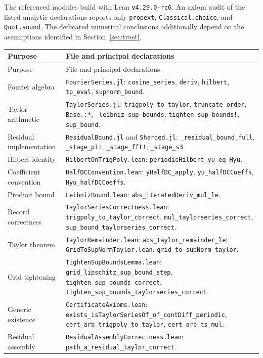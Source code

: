 \documentclass[11pt]{article}
\theoremstyle{definition}
\theoremstyle{remark}
\newcommand{\code}[1]{\nolinkurl{#1}}
\numberwithin{equation}{section}
\begin{document}
The referenced modules build with Lean \code{v4.29.0-rc6}. An axiom audit
of the listed analytic declarations reports only \code{propext},
\code{Classical.choice}, and \code{Quot.sound}. The dedicated numerical
conclusions additionally depend on the assumptions identified in
Section~\ref{sec:trust}.

\begingroup
\small
\begin{longtable}{@{}>{\raggedright\arraybackslash}p{}
  >{\raggedright\arraybackslash}p{}@{}}
\toprule
Purpose & File and principal declarations\\
\midrule
\endfirsthead
\toprule
Purpose & File and principal declarations\\
\midrule
\endhead
Fourier algebra & \code{FourierSeries.jl}: \code{cosine_series},
 \code{deriv}, \code{hilbert}, \code{tp_eval}, \code{supnorm_bound}.\\[0.6em]
Taylor arithmetic & \code{TaylorSeries.jl}: \code{trigpoly_to_taylor},
 \code{truncate_order}, \code{Base.:*}, \code{_leibniz_sup_bounds},
 \code{tighten_sup_bounds!}, \code{sup_bound}.\\[0.6em]
Residual implementation & \code{ResidualBound.jl} and \code{Sharded.jl}:
 \code{_residual_bound_full}, \code{_stage_p1!}, \code{_stage_fft!},
 \code{_stage_s3}.\\[0.6em]
Hilbert identity & \code{HilbertOnTrigPoly.lean}:
 \code{periodicHilbert_yu_eq_Hyu}.\\[0.6em]
Coefficient convention & \code{HalfDCConvention.lean}:
 \code{yHalfDC_apply}, \code{yu_halfDCCoeffs}, \code{Hyu_halfDCCoeffs}.\\[0.6em]
Product bound & \code{LeibnizBound.lean}:
 \code{abs_iteratedDeriv_mul_le}.\\[0.6em]
Record correctness & \code{TaylorSeriesCorrectness.lean}:
 \code{trigpoly_to_taylor_correct}, \code{mul_taylorseries_correct},
 \code{sup_bound_taylorseries_correct}.\\[0.6em]
Taylor theorem & \code{TaylorRemainder.lean}: \code{abs_taylor_remainder_le};
 \code{GridToSupNormTaylor.lean}: \code{grid_to_supNorm_taylor}.\\[0.6em]
Grid tightening & \code{TightenSupBoundsLemma.lean}:
 \code{grid_lipschitz_sup_bound_step}, \code{tighten_sup_bounds_correct},
 \code{tighten_sup_bounds_taylorseries_correct}.\\[0.6em]
Generic existence & \code{CertificateAxioms.lean}:
 \code{exists_isTaylorSeriesOf_of_contDiff_periodic},
 \code{cert_arb_trigpoly_to_taylor}, \code{cert_arb_ts_mul}.\\[0.6em]
Residual assembly & \code{ResidualAssemblyCorrectness.lean}:
 \code{path_a_residual_taylor_correct}.\\
\bottomrule
\end{longtable}
\endgroup
\end{document}
